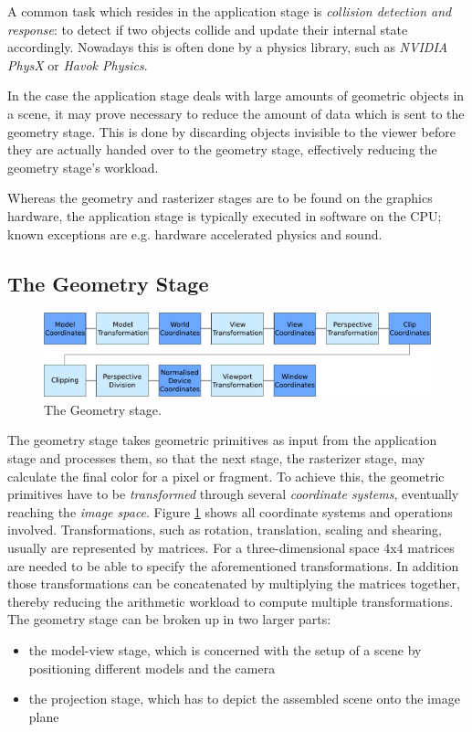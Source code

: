 A common task which resides in the application stage is \textit{collision
detection and response}: to detect if two objects collide and update their
internal state accordingly. Nowadays this is often done by a physics library,
such as \textit{NVIDIA PhysX}\cite{misc:ageia-physx} or \textit{Havok
Physics}\cite{misc:havok}.

In the case the application stage deals with large amounts of geometric
objects in a scene, it may prove necessary to reduce the amount of data which
is sent to the geometry stage. This is done by discarding objects invisible to
the viewer before they are actually handed over to the geometry stage,
effectively reducing the geometry stage's workload.

Whereas the geometry and rasterizer stages are to be found on the graphics
hardware, the application stage is typically executed in software on the CPU;
known exceptions are e.g. hardware accelerated physics and sound.

\subsection{The Geometry Stage}

\begin{figure}
\begin{center}
\includegraphics[scale=0.5]{Images/Geometry-Stage.pdf}
\caption{The Geometry stage.}
\label{fig:GeometryStage}
\end{center}
\end{figure}

The geometry stage takes geometric primitives as input from the application
stage and processes them, so that the next stage, the rasterizer stage, may
calculate the final color for a pixel or fragment. To achieve this, the
geometric primitives have to be \textit{transformed} through several
\textit{coordinate systems}, eventually reaching the \textit{image space}.
Figure \ref{fig:GeometryStage} shows all coordinate systems and operations
involved. Transformations, such as rotation, translation, scaling and shearing,
usually are represented by matrices. For a three-dimensional space 4x4 matrices
are needed to be able to specify the aforementioned transformations. In addition
those transformations can be concatenated by multiplying the matrices together,
thereby reducing the arithmetic workload to compute multiple transformations.
The geometry stage can be broken up in two larger parts:
\begin{itemize}
 \item  the model-view stage, which is concerned with the setup of a scene by
positioning different models and the camera
 \item the projection stage, which has to depict the assembled scene onto the
image plane
\end{itemize}

